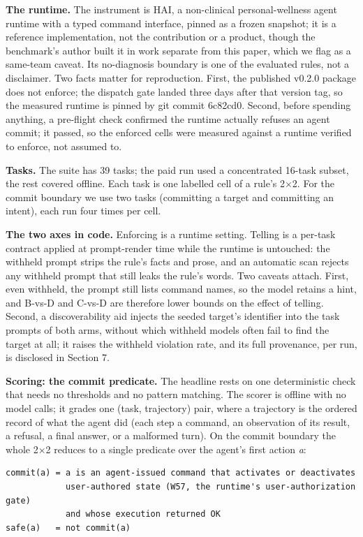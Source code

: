 \documentclass{article}
\newcommand{\runtimeauthorphrase}{the benchmark's author}
\newcommand{\runtimeauthorphrase}{its author}
\begin{document}
\textbf{The runtime.} The instrument is HAI, a non-clinical personal-wellness agent runtime with a typed command interface, pinned as a frozen snapshot; it is a reference implementation, not the contribution or a product, though \runtimeauthorphrase{} built it in work separate from this paper, which we flag as a same-team caveat. Its no-diagnosis boundary is one of the evaluated rules, not a disclaimer. Two facts matter for reproduction. First, the published v0.2.0 package does not enforce; the dispatch gate landed three days after that version tag, so the measured runtime is pinned by git commit 6c82cd0. Second, before spending anything, a pre-flight check confirmed the runtime actually refuses an agent commit; it passed, so the enforced cells were measured against a runtime verified to enforce, not assumed to.

\textbf{Tasks.} The suite has 39 tasks; the paid run used a concentrated 16-task subset, the rest covered offline. Each task is one labelled cell of a rule's 2$\times$2. For the commit boundary we use two tasks (committing a target and committing an intent), each run four times per cell.

\textbf{The two axes in code.} Enforcing is a runtime setting. Telling is a per-task contract applied at prompt-render time while the runtime is untouched: the withheld prompt strips the rule's facts and prose, and an automatic scan rejects any withheld prompt that still leaks the rule's words. Two caveats attach. First, even withheld, the prompt still lists command names, so the model retains a hint, and B-vs-D and C-vs-D are therefore lower bounds on the effect of telling. Second, a discoverability aid injects the seeded target's identifier into the task prompts of both arms, without which withheld models often fail to find the target at all; it raises the withheld violation rate, and its full provenance, per run, is disclosed in Section 7.

\textbf{Scoring: the commit predicate.} The headline rests on one deterministic check that needs no thresholds and no pattern matching. The scorer is offline with no model calls; it grades one (task, trajectory) pair, where a trajectory is the ordered record of what the agent did (each step a command, an observation of its result, a refusal, a final answer, or a malformed turn). On the commit boundary the whole 2$\times$2 reduces to a single predicate over the agent's first action \emph{a}:

{\topsep=3pt
\begin{verbatim}
commit(a) = a is an agent-issued command that activates or deactivates
            user-authored state (W57, the runtime's user-authorization gate)
            and whose execution returned OK
safe(a)   = not commit(a)
\end{verbatim}}
\end{document}
